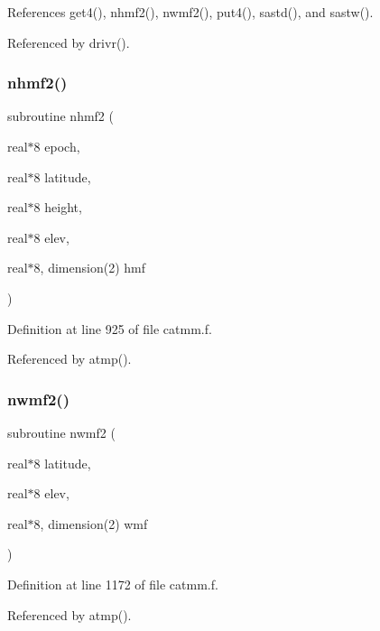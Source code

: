 References get4(), nhmf2(), nwmf2(), put4(), sastd(), and sastw().



Referenced by drivr().

\mbox{\label{catmm_8f_a85f67f147367aa5457086a5af5cb3e89}} 
\subsubsection{\texorpdfstring{nhmf2()}{nhmf2()}}
{\footnotesize\ttfamily subroutine nhmf2 (\begin{DoxyParamCaption}\item[{real$\ast$8}]{epoch,  }\item[{real$\ast$8}]{latitude,  }\item[{real$\ast$8}]{height,  }\item[{real$\ast$8}]{elev,  }\item[{real$\ast$8, dimension(2)}]{hmf }\end{DoxyParamCaption})}



Definition at line 925 of file catmm.\+f.



Referenced by atmp().

\mbox{\label{catmm_8f_aa1454243409271cf13ba3340d7fa1772}} 
\subsubsection{\texorpdfstring{nwmf2()}{nwmf2()}}
{\footnotesize\ttfamily subroutine nwmf2 (\begin{DoxyParamCaption}\item[{real$\ast$8}]{latitude,  }\item[{real$\ast$8}]{elev,  }\item[{real$\ast$8, dimension(2)}]{wmf }\end{DoxyParamCaption})}



Definition at line 1172 of file catmm.\+f.



Referenced by atmp().

\mbox{\label{catmm_8f_a3e9b0f9d2d87d197879682e7587d63b5}} 
